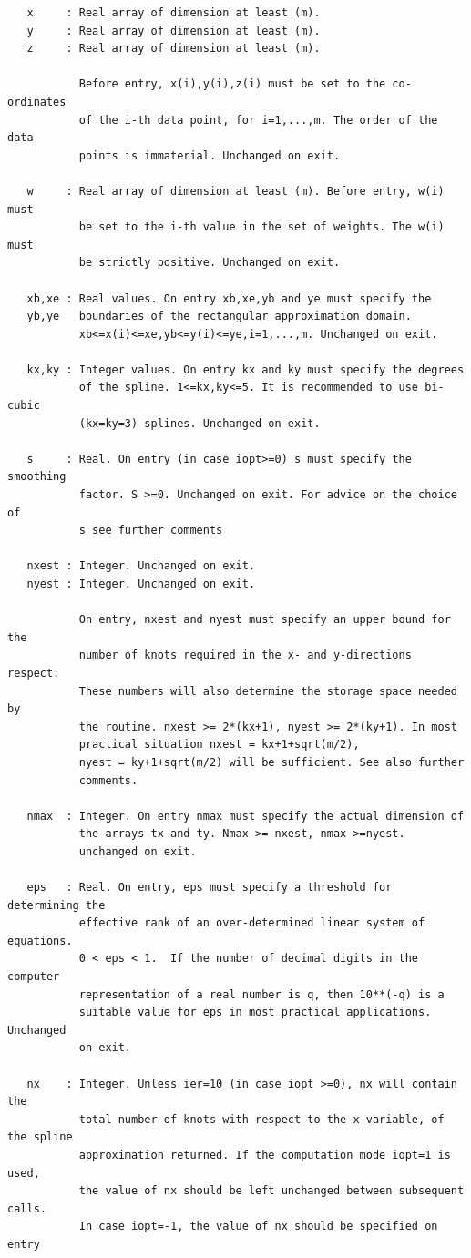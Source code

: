 \documentclass[11pt,twoside]{article}
\begin{document}
\begin{verbatim}
   x     : Real array of dimension at least (m).
   y     : Real array of dimension at least (m).
   z     : Real array of dimension at least (m).

           Before entry, x(i),y(i),z(i) must be set to the co-ordinates
           of the i-th data point, for i=1,...,m. The order of the data
           points is immaterial. Unchanged on exit.

   w     : Real array of dimension at least (m). Before entry, w(i) must
           be set to the i-th value in the set of weights. The w(i) must
           be strictly positive. Unchanged on exit.

   xb,xe : Real values. On entry xb,xe,yb and ye must specify the 
   yb,ye   boundaries of the rectangular approximation domain.
           xb<=x(i)<=xe,yb<=y(i)<=ye,i=1,...,m. Unchanged on exit.

   kx,ky : Integer values. On entry kx and ky must specify the degrees
           of the spline. 1<=kx,ky<=5. It is recommended to use bi-cubic
           (kx=ky=3) splines. Unchanged on exit.

   s     : Real. On entry (in case iopt>=0) s must specify the smoothing
           factor. S >=0. Unchanged on exit. For advice on the choice of 
           s see further comments

   nxest : Integer. Unchanged on exit.
   nyest : Integer. Unchanged on exit.

           On entry, nxest and nyest must specify an upper bound for the
           number of knots required in the x- and y-directions respect.
           These numbers will also determine the storage space needed by
           the routine. nxest >= 2*(kx+1), nyest >= 2*(ky+1). In most 
           practical situation nxest = kx+1+sqrt(m/2), 
           nyest = ky+1+sqrt(m/2) will be sufficient. See also further 
           comments.

   nmax  : Integer. On entry nmax must specify the actual dimension of
           the arrays tx and ty. Nmax >= nxest, nmax >=nyest.
           unchanged on exit.

   eps   : Real. On entry, eps must specify a threshold for determining the
           effective rank of an over-determined linear system of equations. 
           0 < eps < 1.  If the number of decimal digits in the computer 
           representation of a real number is q, then 10**(-q) is a 
           suitable value for eps in most practical applications. Unchanged 
           on exit.

   nx    : Integer. Unless ier=10 (in case iopt >=0), nx will contain the 
           total number of knots with respect to the x-variable, of the spline
           approximation returned. If the computation mode iopt=1 is used, 
           the value of nx should be left unchanged between subsequent calls.
           In case iopt=-1, the value of nx should be specified on entry


\end{verbatim}
\end{document}
